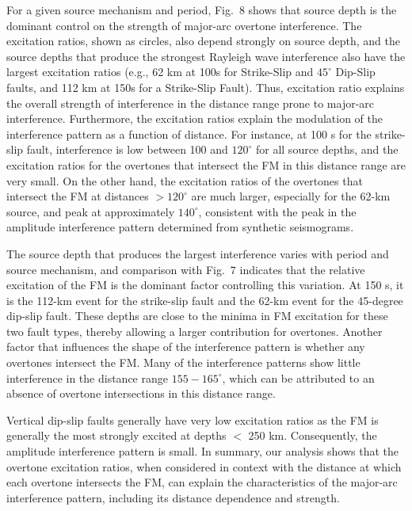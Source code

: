 \documentclass[extra,mreferee]{gji}
\begin{document}
 For a given source mechanism and period, Fig.\ 8 shows that source depth is the dominant control on the strength of major-arc overtone interference. The excitation ratios, shown as circles, also depend strongly on source depth, and the source depths that produce the strongest Rayleigh wave interference also have the largest excitation ratios (e.g., 62 km at 100s for Strike-Slip and $45^\circ$ Dip-Slip faults, and 112 km at 150s for a Strike-Slip Fault). Thus, excitation ratio explains the overall strength of interference in the distance range prone to major-arc interference. Furthermore, the excitation ratios explain the modulation of the interference pattern as a function of distance. For instance, at 100 s for the strike-slip fault, interference is low between 100 and $120^\circ$ for all source depths, and the excitation ratios for the overtones that intersect the FM in this distance range are very small. On the other hand, the excitation ratios of the overtones that intersect the FM at distances $> 120^\circ$ are much larger, especially for the 62-km source, and peak at approximately $140^\circ$, consistent with the peak in the amplitude interference pattern determined from synthetic seismograms. 

The source depth that produces the largest interference varies with period and source mechanism, and comparison with Fig.\ 7 indicates that the relative excitation of the FM is the dominant factor controlling this variation. At 150 s, it is the 112-km event for the strike-slip fault and the 62-km event for the 45-degree dip-slip fault. These depths are close to the minima in FM excitation for these two fault types, thereby allowing a larger contribution for overtones. Another factor that influences the shape of the interference pattern is whether any overtones intersect the FM. Many of the interference patterns show little interference in the distance range $155-165^\circ$, which can be attributed to an absence of overtone intersections in this distance range.  
 
Vertical dip-slip faults generally have very low excitation ratios as the FM is generally the most strongly excited at depths $<$ 250 km. Consequently, the amplitude interference pattern is small. In summary, our analysis shows that the overtone excitation ratios, when considered in context with the distance at which each overtone intersects the FM, can explain the characteristics of the major-arc interference pattern, including its distance dependence and strength. 
\end{document}
